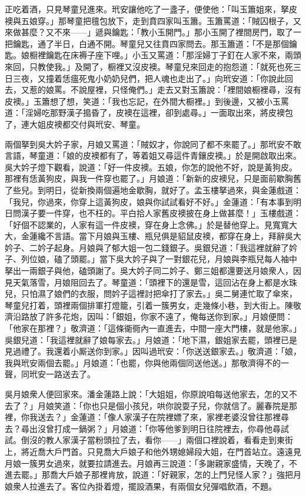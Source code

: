 正吃着酒，只見琴童兒進來。玳安讓他吃了一盞子，便使他：「叫玉簫姐來，拏皮襖與五娘穿。」那琴童把氊包放下，走到賁四家叫玉簫。玉簫罵道：「賊囚根子，又來做甚麼？又不來——」遞與鑰匙：「教小玉開門。」那小玉開了裡間房門，取了一把鑰匙，通了半日，白通不開。琴童兒又往賁四家問去。那玉簫道：「不是那個鑰匙。娘橱裡鑰匙在床褥子座下哩。」小玉又罵道：「那淫婦丁子釘在人家不來，兩頭來回，只教使我。」及開了，橱裡又沒皮襖。琴童兒來回走的抱怨道：「就死也死三日三夜，又撞着恁瘟死鬼小奶奶兒們，把人魂也走出了。」向玳安道：「你說此回去，又惹的娘罵。不說屋裡，只怪俺們。」走去又對玉簫說：「裡間娘橱裡尋，沒有皮襖。」玉簫想了想，笑道：「我也忘記，在外間大橱裡。」到後邊，又被小玉罵道：「淫婦吃那野漢子搗昏了，皮襖在這裡，卻到處尋。」一面取出來，將皮襖包了，連大姐皮襖都交付與玳安、琴童。

兩個拏到吳大妗子家，月娘又罵道：「賊奴才，你說同了都不來罷了。」那玳安不敢言語，琴童道：「娘的皮襖都有了，等着姐又尋這件青鑲皮襖。」於是開啟取出來。吳大妗子燈下觀看，說道：「好一件皮襖。五娘，你怎的說他不好，說是黃狗皮。那裡有恁黃狗皮，與我一件穿也罷了。」月娘道：「新新的皮襖兒，只是面前歇胸舊了些兒。到明日，從新換兩個遍地金歇胸，就好了。孟玉樓拏過來，與金蓮戲道：「我兒，你過來，你穿上這黃狗皮，娘與你試試看好不好。」金蓮道：「有本事到明日問漢子要一件穿，也不枉的。平白拾人家舊皮襖披在身上做甚麼！」玉樓戲道：「好個不認業的，人家有這一件皮襖，穿在身上念佛。」於是替他穿上。見寬寬大大，金蓮纔不言語。當下月娘與玉樓、瓶兒俱是貂鼠皮襖，都穿在身上，拜辭吳大妗子、二妗子起身。月娘與了郁大姐一包二錢銀子。吳銀兒道：「我這裡就辭了妗子、列位娘，磕了頭罷。」當下吳大妗子與了一對銀花兒，月娘與李瓶兒每人袖中拏出一兩銀子與他，磕頭謝了。吳大妗子同二妗子、鄭三姐都還要送月娘衆人，因見天氣落雪，月娘阻回去了。琴童道：「頭裡下的還是雪，這回沾在身上都是水珠兒，只怕濕了娘們的衣服，問妗子這裡討把傘打了家去。」吳二舅連忙取了傘來，琴童兒打着，頭裡兩個排軍打燈籠，引着一簇男女，走幾條小巷，到大街上。陳敬濟沿路放了許多花炮，因叫：「銀姐，你家不遠了，俺每送你到家。」月娘便問：「他家在那裡？」敬濟道：「這條衚衕內一直進去，中間一座大門樓，就是他家。」吳銀兒道：「我這裡就辭了娘每家去。」月娘道：「地下濕，銀姐家去罷，頭裡已是見過禮了。我還着小厮送你到家。」因叫過玳安：「你送送銀家去。」敬濟道：「娘，我與玳安兩個去罷。」月娘道：「也罷，你與他兩個同送他送。」那敬濟得不的一聲，同玳安一路送去了。

吳月娘衆人便回家來。潘金蓮路上說：「大姐姐，你原說咱每送他家去，怎的又不去了？」月娘笑道：「你也只是個小孩兒，哄你說耍子兒，你就信了。麗春院是那裡，你我送去？」金蓮道：「像人家漢子在院裡嫖了來，家裡老婆沒曾往那裡尋去？尋出沒曾打成一鍋粥？」月娘道：「你等他爹到明日往院裡去，你尋他尋試試。倒沒的教人家漢子當粉頭拉了去，看你——」兩個口裡說着，看看走到東街上，將近喬大戶門首。只見喬大戶娘子和他外甥媳婦段大姐，在門首站立。遠遠見月娘一簇男女過來，就要拉請進去。月娘再三說道：「多謝親家盛情，天晚了，不進去罷。」那喬大戶娘子那裡肯放，說道：「好親家，怎的上門兒怪人家？」強把月娘衆人拉進去了。客位內掛着燈，擺設酒果，有兩個女兒彈唱飲酒，不題。

